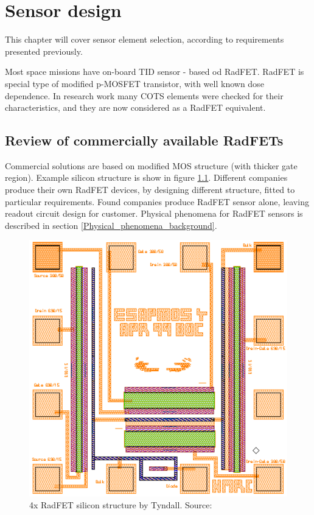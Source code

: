 \chapter{Sensor design}
This chapter will cover sensor element selection, according to requirements presented previously.

Most space missions have on-board TID sensor - based od RadFET. RadFET is special type of modified p-MOSFET transistor, with well known dose dependence. In research work many COTS elements were checked for their characteristics, and they are now considered as a RadFET equivalent.

\section{Review of commercially available RadFETs}
    Commercial solutions are based on modified MOS structure (with thicker gate region). Example silicon structure is show in figure \ref{Tyndall_radfet_silicon}. Different companies produce their own RadFET devices, by designing different structure, fitted to particular requirements. Found companies produce RadFET sensor alone, leaving readout circuit design for customer. Physical phenomena for RadFET sensors is described in section \ref{Physical_phenomena_background}.

    \begin{figure}[H]
        \centering
        \includegraphics[width=0.5\paperwidth]{img/radfet-silicon.eps}
        \caption{4x RadFET silicon structure by Tyndall. Source: \cite{Tyndall_Radfet}}
        \label{Tyndall_radfet_silicon}
    \end{figure}


